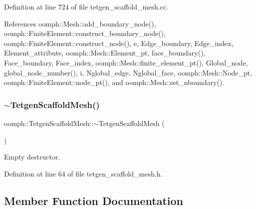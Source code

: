 Definition at line 724 of file tetgen\+\_\+scaffold\+\_\+mesh.\+cc.



References oomph\+::\+Mesh\+::add\+\_\+boundary\+\_\+node(), oomph\+::\+Finite\+Element\+::construct\+\_\+boundary\+\_\+node(), oomph\+::\+Finite\+Element\+::construct\+\_\+node(), e, Edge\+\_\+boundary, Edge\+\_\+index, Element\+\_\+attribute, oomph\+::\+Mesh\+::\+Element\+\_\+pt, face\+\_\+boundary(), Face\+\_\+boundary, Face\+\_\+index, oomph\+::\+Mesh\+::finite\+\_\+element\+\_\+pt(), Global\+\_\+node, global\+\_\+node\+\_\+number(), i, Nglobal\+\_\+edge, Nglobal\+\_\+face, oomph\+::\+Mesh\+::\+Node\+\_\+pt, oomph\+::\+Finite\+Element\+::node\+\_\+pt(), and oomph\+::\+Mesh\+::set\+\_\+nboundary().

\mbox{\label{classoomph_1_1TetgenScaffoldMesh_a7f6b1814f536bd153231c9fb076c614b}} 
\subsubsection{\texorpdfstring{$\sim$\+Tetgen\+Scaffold\+Mesh()}{~TetgenScaffoldMesh()}}
{\footnotesize\ttfamily oomph\+::\+Tetgen\+Scaffold\+Mesh\+::$\sim$\+Tetgen\+Scaffold\+Mesh (\begin{DoxyParamCaption}{ }\end{DoxyParamCaption})\hspace{0.3cm}{\ttfamily [inline]}}



Empty destructor. 



Definition at line 64 of file tetgen\+\_\+scaffold\+\_\+mesh.\+h.



\subsection{Member Function Documentation}
\mbox{\label{classoomph_1_1TetgenScaffoldMesh_a4f1f09422947c46cfbfd699455605ebc}} 
